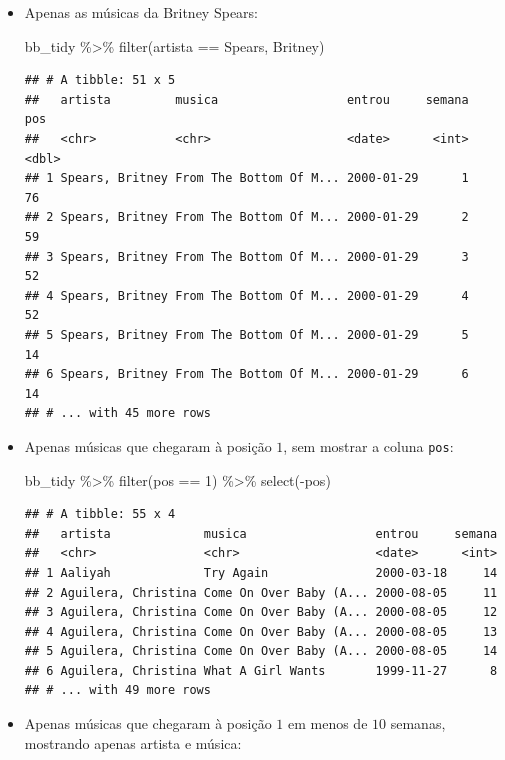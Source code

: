 \documentclass[
  11pt]{report}
\newenvironment{Shaded}{\begin{snugshade}}{\end{snugshade}}
\newcommand{\DecValTok}[1]{\textcolor[rgb]{0.00,0.00,0.81}{#1}}
\newcommand{\FunctionTok}[1]{\textcolor[rgb]{0.00,0.00,0.00}{#1}}
\newcommand{\NormalTok}[1]{#1}
\newcommand{\SpecialCharTok}[1]{\textcolor[rgb]{0.00,0.00,0.00}{#1}}
\newcommand{\StringTok}[1]{\textcolor[rgb]{0.31,0.60,0.02}{#1}}
\renewenvironment{Shaded}{
    \begin{mdframed}[%
      roundcorner=2pt,%
      innerleftmargin=5pt,%
      innerrightmargin=5pt,%
      topline=true,%
      leftline=true,%
      rightline=true,%
      bottomline=true,%
      linewidth=0.5pt,%
      linecolor=black!20,%
      backgroundcolor=black!2,%
      skipabove=2ex,%
      skipbelow=2.5ex%
    ]%
  }
  {
    \end{mdframed}
  }
\begin{document}
\begin{itemize}
\item
  Apenas as músicas da Britney Spears:

\begin{Shaded}
\begin{Highlighting}[]
\NormalTok{bb\_tidy }\SpecialCharTok{\%\textgreater{}\%} 
  \FunctionTok{filter}\NormalTok{(artista }\SpecialCharTok{==} \StringTok{\textquotesingle{}Spears, Britney\textquotesingle{}}\NormalTok{)}
\end{Highlighting}
\end{Shaded}

\begin{verbatim}
## # A tibble: 51 x 5
##   artista         musica                  entrou     semana   pos
##   <chr>           <chr>                   <date>      <int> <dbl>
## 1 Spears, Britney From The Bottom Of M... 2000-01-29      1    76
## 2 Spears, Britney From The Bottom Of M... 2000-01-29      2    59
## 3 Spears, Britney From The Bottom Of M... 2000-01-29      3    52
## 4 Spears, Britney From The Bottom Of M... 2000-01-29      4    52
## 5 Spears, Britney From The Bottom Of M... 2000-01-29      5    14
## 6 Spears, Britney From The Bottom Of M... 2000-01-29      6    14
## # ... with 45 more rows
\end{verbatim}
\item
  Apenas músicas que chegaram à posição $1$, sem mostrar a coluna \texttt{pos}:

\begin{Shaded}
\begin{Highlighting}[]
\NormalTok{bb\_tidy }\SpecialCharTok{\%\textgreater{}\%} 
  \FunctionTok{filter}\NormalTok{(pos }\SpecialCharTok{==} \DecValTok{1}\NormalTok{) }\SpecialCharTok{\%\textgreater{}\%} 
  \FunctionTok{select}\NormalTok{(}\SpecialCharTok{{-}}\NormalTok{pos)}
\end{Highlighting}
\end{Shaded}

\begin{verbatim}
## # A tibble: 55 x 4
##   artista             musica                  entrou     semana
##   <chr>               <chr>                   <date>      <int>
## 1 Aaliyah             Try Again               2000-03-18     14
## 2 Aguilera, Christina Come On Over Baby (A... 2000-08-05     11
## 3 Aguilera, Christina Come On Over Baby (A... 2000-08-05     12
## 4 Aguilera, Christina Come On Over Baby (A... 2000-08-05     13
## 5 Aguilera, Christina Come On Over Baby (A... 2000-08-05     14
## 6 Aguilera, Christina What A Girl Wants       1999-11-27      8
## # ... with 49 more rows
\end{verbatim}
\item
  Apenas músicas que chegaram à posição $1$ em menos de $10$ semanas, mostrando apenas artista e música:


\end{itemize}
\end{document}
